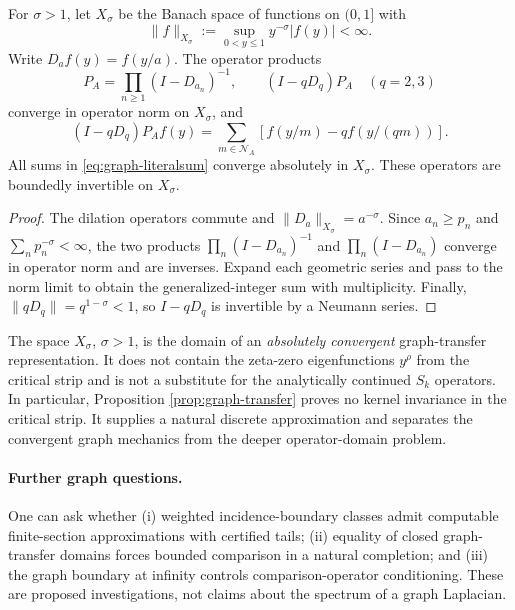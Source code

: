 \begin{proposition}
\label{prop:graph-transfer}
For \(\sigma>1\), let \(X_\sigma\) be the Banach space of functions
on \((0,1]\) with
\[
 \|f\|_{X_\sigma}:=\sup_{0<y\le1}y^{-\sigma}|f(y)|<\infty.
\]
Write \(D_a f(y)=f(y/a)\).  The operator products
\begin{equation}\label{eq:graph-resolvents}
 P_A=\prod_{n\ge1}(I-D_{a_n})^{-1},
 \qquad
 (I-qD_q)P_A\quad(q=2,3)
\end{equation}
converge in operator norm on \(X_\sigma\), and
\begin{equation}\label{eq:graph-literalsum}
 (I-qD_q)P_Af(y)
 =\sum_{m\in\mathcal N_A}
 \left[f(y/m)-qf(y/(qm))\right].
\end{equation}
All sums in \eqref{eq:graph-literalsum} converge absolutely in
\(X_\sigma\).  These operators are boundedly invertible on
\(X_\sigma\).
\end{proposition}
\begin{proof}
The dilation operators commute and
\(\|D_a\|_{X_\sigma}=a^{-\sigma}\).
Since \(a_n\ge p_n\) and
\(\sum_n p_n^{-\sigma}<\infty\), the two products
\(\prod_n(I-D_{a_n})^{-1}\) and
\(\prod_n(I-D_{a_n})\) converge in operator norm and
are inverses.  Expand each geometric series and pass to the
norm limit to obtain the generalized-integer sum with
multiplicity.  Finally,
\(\|qD_q\|=q^{1-\sigma}<1\), so \(I-qD_q\) is invertible
by a Neumann series.
\end{proof}

\begin{remark}
The space \(X_\sigma\), \(\sigma>1\), is the domain of an
\emph{absolutely convergent} graph-transfer representation.  It
does not contain the zeta-zero eigenfunctions \(y^\rho\) from the
critical strip and is not a substitute for the analytically
continued \(S_k\) operators.  In particular, Proposition
\ref{prop:graph-transfer} proves no kernel invariance in the
critical strip.  It supplies a natural discrete approximation
and separates the convergent graph mechanics from the deeper
operator-domain problem.
\end{remark}

\paragraph{Further graph questions.}
One can ask whether (i) weighted incidence-boundary classes
admit computable finite-section approximations with certified
tails; (ii) equality of closed graph-transfer domains forces
bounded comparison in a natural completion; and (iii) the
graph boundary at infinity controls comparison-operator
conditioning.  These are proposed investigations, not claims
about the spectrum of a graph Laplacian.
